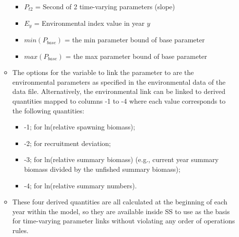 \begin{itemize}
\begin{itemize}
\begin{itemize}
           \item $P_{t2}$ = Second of 2 time-varying parameters (slope)
           \item $E_{y}$ = Environmental index value in year $y$
           \item $min(P_{base})$ = the min parameter bound of base parameter
           \item $max(P_{base})$ = the max parameter bound of base parameter
        \end{itemize}
		\item The options for the variable to link the parameter to are the environmental parameters as specified in the environmental data of the data file. Alternatively, the environmental link can be linked to derived quantities mapped to columns -1 to -4 where each value corresponds to the following quantities:
		\begin{itemize}
			\item -1;  for ln(relative spawning biomass);
			\item -2;  for recruitment deviation;
			\item -3;  for ln(relative summary biomass) (e.g., current year summary biomass divided by the unfished summary biomass);
			\item -4;  for ln(relative summary numbers).
		\end{itemize}
		\item These four derived quantities are all calculated at the beginning of each year within the model, so they are available inside SS to use as the basis for time-varying parameter links without violating any order of operations rules.
	\end{itemize}
	

\end{itemize}
